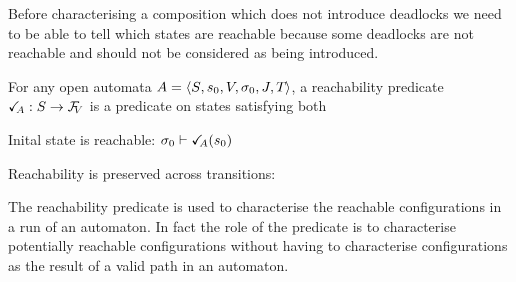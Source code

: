 \documentclass[runningheads]{llncs}
\begin{document}
Before characterising a composition which does not introduce deadlocks we need to be able to tell which states are reachable because some deadlocks are not reachable and should not be considered as being introduced.
\begin{definition}[Reachability]
For any open automata \(A = \OAg\), a reachability predicate \(\reach{A}: S \to \rformulas[V]\) is a predicate on states satisfying both

 Inital state is reachable: \(\sigma_0 \vdash \reach{A}\mpar{s_0}\)

 Reachability is preserved across transitions: 
\end{definition}
The reachability predicate is used to characterise the reachable configurations in a run of an automaton.
In fact the role of the predicate is to characterise potentially reachable configurations without having to characterise configurations as the result of a valid path in an automaton.
\end{document}
